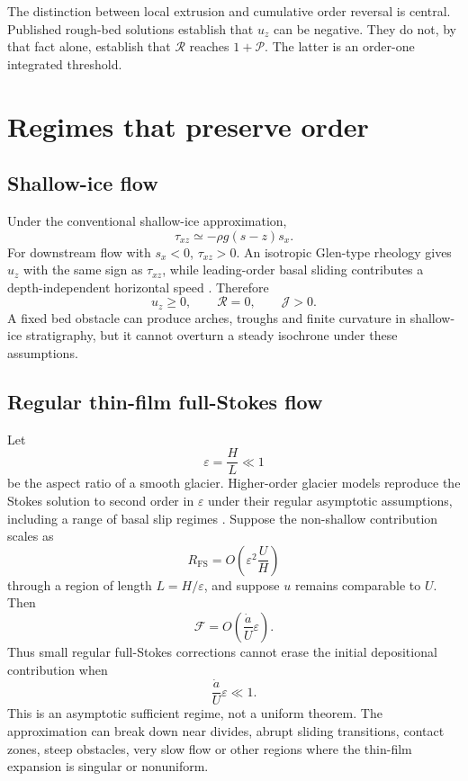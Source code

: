 \documentclass[review]{igs}
\newcommand{\parencite}{\citep}
\theoremstyle{definition}
\theoremstyle{remark}
\newcommand{\Rpos}{\mathcal{P}}
\newcommand{\Rneg}{\mathcal{R}}
\newcommand{\Jord}{\mathcal{J}}
\newcommand{\Gfs}{\mathcal{F}}
\begin{document}
The distinction between local extrusion and cumulative order reversal is central. Published rough-bed solutions establish that \(u_z\) can be negative. They do not, by that fact alone, establish that \(\Rneg\) reaches \(1+\Rpos\). The latter is an order-one integrated threshold.

\section{Regimes that preserve order}

\subsection{Shallow-ice flow}

Under the conventional shallow-ice approximation,
\begin{equation}
\tau_{xz}\simeq-\rho g(s-z)s_x.
\label{eq:SIAstress}
\end{equation}
For downstream flow with \(s_x<0\), \(\tau_{xz}>0\). An isotropic Glen-type rheology gives \(u_z\) with the same sign as \(\tau_{xz}\), while leading-order basal sliding contributes a depth-independent horizontal speed \parencite{CuffeyPaterson2010}. Therefore
\begin{equation}
 u_z\geq0,
 \qquad \Rneg=0,
 \qquad \Jord>0.
\label{eq:SIAorder}
\end{equation}
A fixed bed obstacle can produce arches, troughs and finite curvature in shallow-ice stratigraphy, but it cannot overturn a steady isochrone under these assumptions.

\subsection{Regular thin-film full-Stokes flow}

Let
\begin{equation}
\varepsilon=\frac{H}{L}\ll1
\end{equation}
be the aspect ratio of a smooth glacier. Higher-order glacier models reproduce the Stokes solution to second order in \(\varepsilon\) under their regular asymptotic assumptions, including a range of basal slip regimes \parencite{Blatter1995,SchoofHindmarsh2010}. Suppose the non-shallow contribution scales as
\begin{equation}
R_{\mathrm{FS}}=O\left(\varepsilon^2\frac{U}{H}\right)
\label{eq:RFSscale}
\end{equation}
through a region of length \(L=H/\varepsilon\), and suppose \(u\) remains comparable to \(U\). Then
\begin{equation}
\Gfs=O\left(\frac{\dot a}{U}\varepsilon\right).
\label{eq:GFSscale}
\end{equation}
Thus small regular full-Stokes corrections cannot erase the initial depositional contribution when
\begin{equation}
\frac{\dot a}{U}\varepsilon\ll1.
\label{eq:thinorder}
\end{equation}
This is an asymptotic sufficient regime, not a uniform theorem. The approximation can break down near divides, abrupt sliding transitions, contact zones, steep obstacles, very slow flow or other regions where the thin-film expansion is singular or nonuniform.
\end{document}
